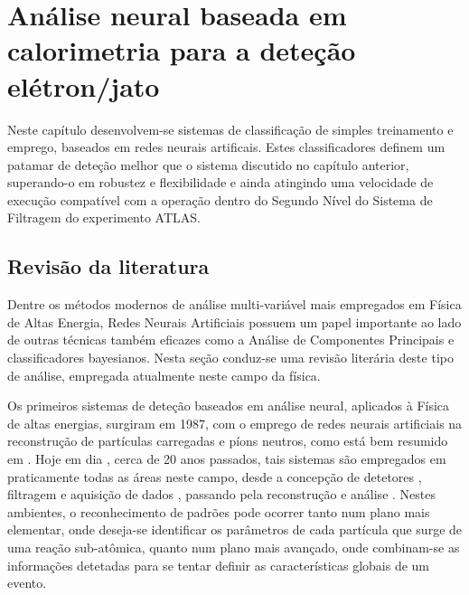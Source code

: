 \typeout{ ====================================================================}
\typeout{ ====================================================================}

\chapter{Análise neural baseada em calorimetria para a deteção
elétron/jato} 
\label{chap:neural}

Neste capítulo desenvolvem-se sistemas de classificação de simples treinamento
e emprego, baseados em redes neurais artificais. Estes classificadores definem
um patamar de deteção melhor que o sistema discutido no capítulo anterior,
superando-o em robustez e flexibilidade e ainda atingindo uma velocidade de
execução compatível com a operação dentro do Segundo Nível do Sistema de
Filtragem do experimento ATLAS.

\section{Revisão da literatura}
\label{sec:review}

Dentre os métodos modernos de análise multi-variável mais empregados em Física
de Altas Energia, Redes Neurais Artificiais possuem um papel importante ao
lado de outras técnicas também eficazes como a Análise de Componentes
Principais e classificadores bayesianos. Nesta seção conduz-se uma revisão
literária deste tipo de análise, empregada atualmente neste campo da física.

Os primeiros sistemas de deteção baseados em análise neural, aplicados à
Física de altas energias, surgiram em 1987, com o emprego de redes neurais
artificiais na reconstrução de partículas carregadas e píons neutros, como
está bem resumido em \cite{denby-nim-1997}. Hoje em dia \cite{denby-nim-2004},
cerca de 20 anos passados, tais sistemas são empregados em praticamente todas
as áreas neste campo, desde a concepção de detetores \cite{wilk-nim-2006},
filtragem e aquisição de dados \cite{denby-nim-2003, kohne-nim-1997,
varela-cms-1998}, passando pela reconstrução 
\cite{peterson-nim-1988} e análise
\cite{kiesling-nim-2004, bhat-aip-1995}. Nestes ambientes, o reconhecimento de
padrões pode ocorrer tanto num plano mais elementar, onde deseja-se
identificar os parâmetros de cada partícula que surge de uma reação
sub-atômica, quanto num plano mais avançado, onde combinam-se as informações
detetadas para se tentar definir as características globais de um evento.

